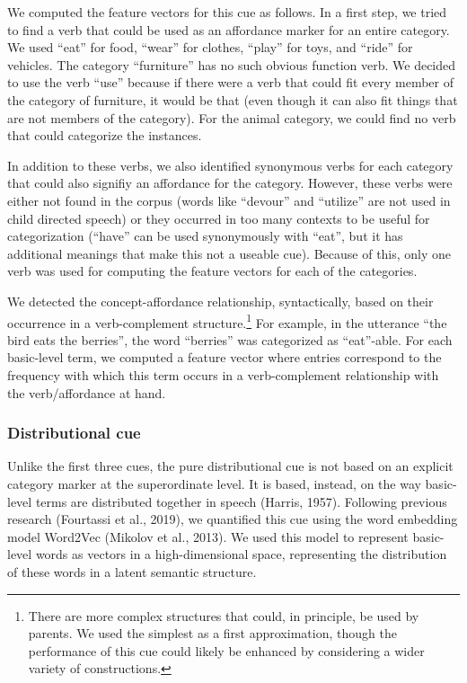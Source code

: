 \documentclass[english,,man,floatsintext]{apa6}
\let\rmarkdownfootnote\footnote%
\def\footnote{\protect\rmarkdownfootnote}
\begin{document}
We computed the feature vectors for this cue as follows. In a first step, we tried to find a verb that could be used as an affordance marker for an entire category. We used \enquote{eat} for food, \enquote{wear} for clothes, \enquote{play} for toys, and \enquote{ride} for vehicles. The category \enquote{furniture} has no such obvious function verb. We decided to use the verb \enquote{use} because if there were a verb that could fit every member of the category of furniture, it would be that (even though it can also fit things that are not members of the category). For the animal category, we could find no verb that could categorize the instances.

In addition to these verbs, we also identified synonymous verbs for each category that could also signifiy an affordance for the category. However, these verbs were either not found in the corpus (words like \enquote{devour} and \enquote{utilize} are not used in child directed speech) or they occurred in too many contexts to be useful for categorization (\enquote{have} can be used synonymously with \enquote{eat}, but it has additional meanings that make this not a useable cue). Because of this, only one verb was used for computing the feature vectors for each of the categories.

We detected the concept-affordance relationship, syntactically, based on their occurrence in a verb-complement structure.\footnote{There are more complex structures that could, in principle, be used by parents. We used the simplest as a first approximation, though the performance of this cue could likely be enhanced by considering a wider variety of constructions.} For example, in the utterance \enquote{the bird eats the berries}, the word \enquote{berries} was categorized as \enquote{eat}-able. For each basic-level term, we computed a feature vector where entries correspond to the frequency with which this term occurs in a verb-complement relationship with the verb/affordance at hand.

\hypertarget{distributional-cue}{%
\subsubsection{Distributional cue}\label{distributional-cue}}

Unlike the first three cues, the pure distributional cue is not based on an explicit category marker at the superordinate level. It is based,
instead, on the way basic-level terms are distributed together in speech (Harris, 1957). Following previous research (Fourtassi et al., 2019), we quantified this cue using the word embedding model Word2Vec (Mikolov et al., 2013). We used this model to represent basic-level words as vectors in a high-dimensional space, representing the distribution of these words in a latent semantic structure.
\end{document}
